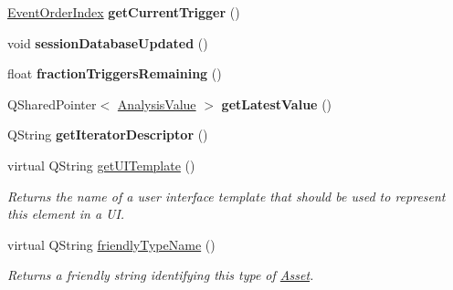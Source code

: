 \begin{DoxyCompactItemize}
\item 
\hypertarget{class_picto_1_1_analysis_trigger_afb9a71281455649c19bdba03954150cb}{\hyperlink{class_picto_1_1_event_order_index}{Event\-Order\-Index} {\bfseries get\-Current\-Trigger} ()}\label{class_picto_1_1_analysis_trigger_afb9a71281455649c19bdba03954150cb}

\item 
\hypertarget{class_picto_1_1_analysis_trigger_aebb8a9d0040c737417377866fe2ec222}{void {\bfseries session\-Database\-Updated} ()}\label{class_picto_1_1_analysis_trigger_aebb8a9d0040c737417377866fe2ec222}

\item 
\hypertarget{class_picto_1_1_analysis_trigger_aab0f99846cdcf84f2a8af1c29b045325}{float {\bfseries fraction\-Triggers\-Remaining} ()}\label{class_picto_1_1_analysis_trigger_aab0f99846cdcf84f2a8af1c29b045325}

\item 
\hypertarget{class_picto_1_1_analysis_trigger_aae32715aaed4b586550e3f28da893da4}{Q\-Shared\-Pointer$<$ \hyperlink{struct_picto_1_1_analysis_value}{Analysis\-Value} $>$ {\bfseries get\-Latest\-Value} ()}\label{class_picto_1_1_analysis_trigger_aae32715aaed4b586550e3f28da893da4}

\item 
\hypertarget{class_picto_1_1_analysis_trigger_a4177a96a9c4dfe0a72d718b3c460a3ab}{Q\-String {\bfseries get\-Iterator\-Descriptor} ()}\label{class_picto_1_1_analysis_trigger_a4177a96a9c4dfe0a72d718b3c460a3ab}

\item 
\hypertarget{class_picto_1_1_analysis_trigger_a6150727e1e4555adb3e78d09d898663d}{virtual Q\-String \hyperlink{class_picto_1_1_analysis_trigger_a6150727e1e4555adb3e78d09d898663d}{get\-U\-I\-Template} ()}\label{class_picto_1_1_analysis_trigger_a6150727e1e4555adb3e78d09d898663d}

\begin{DoxyCompactList}\small\item\em Returns the name of a user interface template that should be used to represent this element in a U\-I. \end{DoxyCompactList}\item 
virtual Q\-String \hyperlink{class_picto_1_1_analysis_trigger_aabe96e5baffc4e521022b1c7f6ec4b53}{friendly\-Type\-Name} ()
\begin{DoxyCompactList}\small\item\em Returns a friendly string identifying this type of \hyperlink{class_picto_1_1_asset}{Asset}. \end{DoxyCompactList}\end{DoxyCompactItemize}
